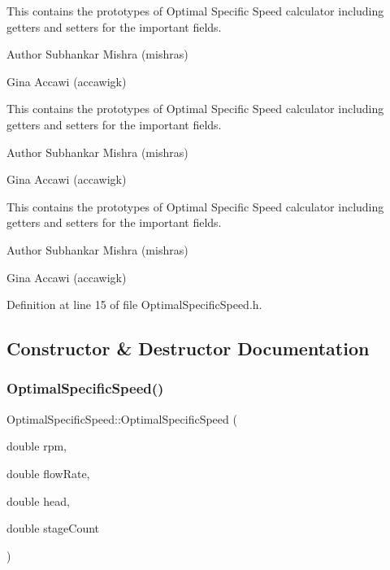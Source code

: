 This contains the prototypes of Optimal Specific Speed calculator including getters and setters for the important fields.

\begin{DoxyAuthor}{Author}
Subhankar Mishra (mishras) 

Gina Accawi (accawigk) 
\end{DoxyAuthor}


This contains the prototypes of Optimal Specific Speed calculator including getters and setters for the important fields.

\begin{DoxyAuthor}{Author}
Subhankar Mishra (mishras) 

Gina Accawi (accawigk) 
\end{DoxyAuthor}


This contains the prototypes of Optimal Specific Speed calculator including getters and setters for the important fields.

\begin{DoxyAuthor}{Author}
Subhankar Mishra (mishras) 

Gina Accawi (accawigk) 
\end{DoxyAuthor}


Definition at line 15 of file Optimal\+Specific\+Speed.\+h.



\subsection{Constructor \& Destructor Documentation}
\mbox{\label{class_optimal_specific_speed_a3cd734e4ecd1a74cb0c25f14dc567eba}} 
\subsubsection{\texorpdfstring{Optimal\+Specific\+Speed()}{OptimalSpecificSpeed()}\hspace{0.1cm}{\footnotesize\ttfamily [1/3]}}
{\footnotesize\ttfamily Optimal\+Specific\+Speed\+::\+Optimal\+Specific\+Speed (\begin{DoxyParamCaption}\item[{double}]{rpm,  }\item[{double}]{flow\+Rate,  }\item[{double}]{head,  }\item[{double}]{stage\+Count }\end{DoxyParamCaption})\hspace{0.3cm}{\ttfamily [inline]}}

